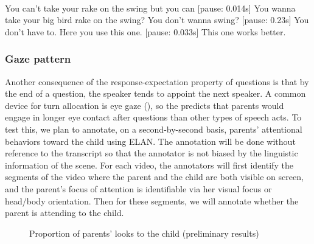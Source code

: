 \\ 
\bxl
\ex You can’t take your rake on the swing but you can [pause: 0.014s] You wanna take your big bird rake on the swing? 			\hfill {}
\ex You don't wanna swing? [pause: 0.23s]	You don’t have to.	\hfill {}
\ex Here you use this one. [pause: 0.033s] This one works better.	\hfill {}
\exl
\eex



\subsubsection{Gaze pattern}
\label{sec:engsp:results:gaze}



Another consequence of the response-expectation property of questions is that by the end of a question, the speaker tends to appoint the next speaker. A common device for turn allocation is eye gaze (\citealt{argyle1972gaze, kendon1967gaze,duncan1979gaze, rossano2009gaze}), so the \hypos{} predicts that parents would engage in longer eye contact after questions than other types of speech acts. To test this, we plan to annotate, on a second-by-second basis, parents' attentional behaviors toward the child using ELAN. The annotation will be done without reference to the transcript so that the annotator is not biased by the linguistic information of the scene. For each video, the annotators will first identify the segments of the video where the parent and the child are both visible on screen, and the parent’s focus of attention is identifiable via her visual focus or head/body orientation. Then for these segments, we will annotate whether the parent is attending to the child.  


\begin{figure}[H]
\label{fg:attention}
\begin{center}
	\caption{Proportion of parents' looks to the child (preliminary results)}
\end{center}
\end{figure}


